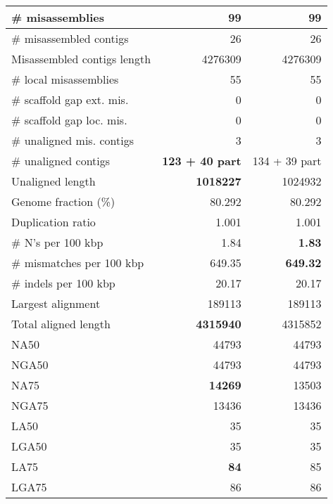 \documentclass[12pt,a4paper]{article}
\begin{document}
\begin{table}[ht]
\begin{center}
\begin{tabular}{|l*{2}{|r}|}
\# misassemblies & 99 & 99 \\ \hline
\# misassembled contigs & 26 & 26 \\ \hline
Misassembled contigs length & 4276309 & 4276309 \\ \hline
\# local misassemblies & 55 & 55 \\ \hline
\# scaffold gap ext. mis. & 0 & 0 \\ \hline
\# scaffold gap loc. mis. & 0 & 0 \\ \hline
\# unaligned mis. contigs & 3 & 3 \\ \hline
\# unaligned contigs & {\bf 123 + 40 part} & 134 + 39 part \\ \hline
Unaligned length & {\bf 1018227} & 1024932 \\ \hline
Genome fraction (\%) & 80.292 & 80.292 \\ \hline
Duplication ratio & 1.001 & 1.001 \\ \hline
\# N's per 100 kbp & 1.84 & {\bf 1.83} \\ \hline
\# mismatches per 100 kbp & 649.35 & {\bf 649.32} \\ \hline
\# indels per 100 kbp & 20.17 & 20.17 \\ \hline
Largest alignment & 189113 & 189113 \\ \hline
Total aligned length & {\bf 4315940} & 4315852 \\ \hline
NA50 & 44793 & 44793 \\ \hline
NGA50 & 44793 & 44793 \\ \hline
NA75 & {\bf 14269} & 13503 \\ \hline
NGA75 & 13436 & 13436 \\ \hline
LA50 & 35 & 35 \\ \hline
LGA50 & 35 & 35 \\ \hline
LA75 & {\bf 84} & 85 \\ \hline
LGA75 & 86 & 86 \\ \hline
\end{tabular}
\end{center}
\end{table}
\end{document}
